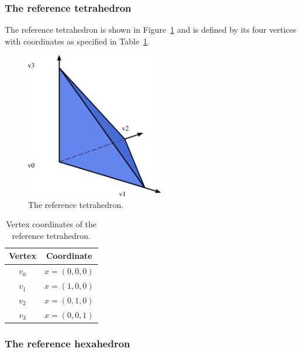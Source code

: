 \subsubsection{The reference tetrahedron}

The reference tetrahedron is shown in Figure~\ref{fig:tetrahedron} and
is defined by its four vertices with coordinates as specified in
Table~\ref{tab:tetrahedron,vertices}.

\begin{figure}
  \begin{center}
    \includegraphics[width=6cm]{chapters/alnes-2/eps/tetrahedron.eps}
    \caption{The reference tetrahedron.}
    \label{fig:tetrahedron}
  \end{center}
\end{figure}

\begin{table}
\linespread{1.2}\selectfont
  \begin{center}
    \begin{tabular}{|c|c|}
      \hline
      Vertex & Coordinate \\
      \hline
      \hline
      $v_0$ & $x = (0, 0, 0)$ \\
      \hline
      $v_1$ & $x = (1, 0, 0)$ \\
      \hline
      $v_2$ & $x = (0, 1, 0)$ \\
      \hline
      $v_3$ & $x = (0, 0, 1)$ \\
      \hline
    \end{tabular}
    \caption{Vertex coordinates of the reference tetrahedron.}
    \label{tab:tetrahedron,vertices}
  \end{center}
\end{table}

\subsubsection{The reference hexahedron}

